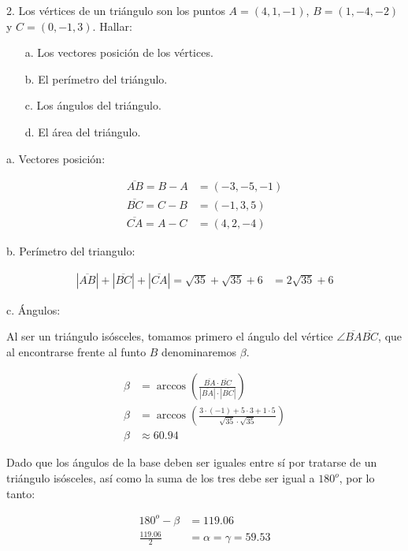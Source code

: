 \documentclass{article}
\begin{document}
2. Los vértices de un triángulo son los puntos $A = (4,1,-1)$,
$B = (1,-4,-2)$ y $C = (0,-1,3)$. Hallar:
\begin{itemize}
    \item[a.] Los vectores posición de los vértices.
    \item[b.] El perímetro del triángulo.
    \item[c.] Los ángulos del triángulo.
    \item[d.] El área del triángulo.
\end{itemize}

a. Vectores posición:

\begin{align*}
    \overline{AB} = B - A & = \boxed{(-3, -5, -1)} \\
    \overline{BC} = C - B & = \boxed{(-1, 3, 5)}   \\
    \overline{CA} = A - C & = \boxed{(4, 2, -4)}
\end{align*}

b. Perímetro del triangulo:

\begin{align*}
    |\overline{AB}| + |\overline{BC}| + |\overline{CA}| =
    \sqrt{35} + \sqrt{35} + 6 & = \boxed{2\sqrt{35} + 6}
\end{align*}

c. Ángulos:

Al ser un triángulo isósceles, tomamos primero el ángulo del vértice
$\angle \overline{BA}\overline{BC}$, que al encontrarse frente al funto $B$
denominaremos $\beta$.

\begin{align*}
    \beta & = \arccos \left(\frac{\overline{BA} \cdot \overline{BC}}
    {|\overline{BA}| \cdot |\overline{BC}|}\right)                      \\
    \beta & = \arccos \left(\frac{3 \cdot (-1) + 5 \cdot 3 + 1 \cdot 5}
    {\sqrt{35} \cdot \sqrt{35}}\right)                                  \\
    \beta & \approx \boxed{60.94}
\end{align*}

Dado que los ángulos de la base deben ser iguales entre sí por tratarse de un
triángulo isósceles, así como la suma de los tres debe ser igual a $180^o$,
por lo tanto:

\begin{align*}
    180^o - \beta    & = 119.06                          \\
    \frac{119.06}{2} & = \alpha = \gamma = \boxed{59.53}
\end{align*}
\end{document}
